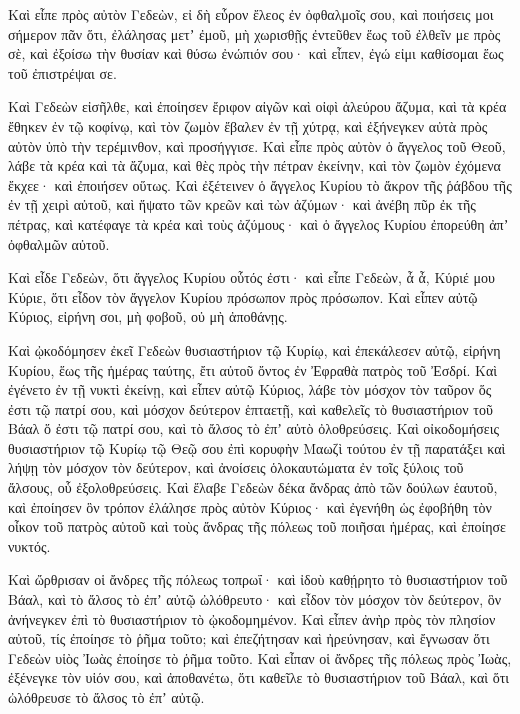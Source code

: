 {Καὶ εἶπε πρὸς αὐτὸν Γεδεὼν, εἰ δὴ εὗρον ἔλεος ἐν ὀφθαλμοῖς σου, καὶ ποιήσεις μοι σήμερον πᾶν ὅτι, ἐλάλησας μετʼ ἐμοῦ,
μὴ χωρισθῇς ἐντεῦθεν ἕως τοῦ ἐλθεῖν με πρὸς σὲ, καὶ ἐξοίσω τὴν θυσίαν καὶ θύσω ἐνώπιόν σου· καὶ εἶπεν, ἐγώ εἰμι καθίσομαι ἕως τοῦ ἐπιστρέψαι σε.
\par }{\PP {}Καὶ Γεδεὼν εἰσῆλθε, καὶ ἐποίησεν ἔριφον αἰγῶν καὶ οἰφὶ ἀλεύρου ἄζυμα, καὶ τὰ κρέα ἔθηκεν ἐν τῷ κοφίνῳ, καὶ τὸν ζωμὸν ἔβαλεν ἐν τῇ χύτρᾳ, καὶ ἐξήνεγκεν αὐτὰ πρὸς αὐτὸν ὑπὸ τὴν τερέμινθον, καὶ προσήγγισε.
Καὶ εἶπε πρὸς αὐτὸν ὁ ἄγγελος τοῦ Θεοῦ, λάβε τὰ κρέα καὶ τὰ ἄζυμα, καὶ θὲς πρὸς τὴν πέτραν ἐκείνην, καὶ τὸν ζωμὸν ἐχόμενα ἔκχεε· καὶ ἐποιήσεν οὕτως.
Καὶ ἐξέτεινεν ὁ ἄγγελος Κυρίου τὸ ἄκρον τῆς ῥάβδου τῆς ἐν τῇ χειρὶ αὐτοῦ, καὶ ἥψατο τῶν κρεῶν καὶ τὼν ἀζύμων· καὶ ἀνέβη πῦρ ἐκ τῆς πέτρας, καὶ κατέφαγε τὰ κρέα καὶ τοὺς ἀζύμους· καὶ ὁ ἄγγελος Κυρίου ἐπορεύθη ἀπʼ ὀφθαλμῶν αὐτοῦ.
\par }{\PP {}Καὶ εἶδε Γεδεὼν, ὅτι ἄγγελος Κυρίου οὗτός ἐστι· καὶ εἶπε Γεδεὼν, ἆ ἆ, Κύριέ μου Κύριε, ὅτι εἶδον τὸν ἄγγελον Κυρίου πρόσωπον πρὸς πρόσωπον.
Καὶ εἶπεν αὐτῷ Κύριος, εἰρήνη σοι, μὴ φοβοῦ, οὐ μὴ ἀποθάνῃς.
\par }{\PP {}Καὶ ᾠκοδόμησεν ἐκεῖ Γεδεὼν θυσιαστήριον τῷ Κυρίῳ, καὶ ἐπεκάλεσεν αὐτῷ, εἰρήνη Κυρίου, ἕως τῆς ἡμέρας ταύτης, ἔτι αὐτοῦ ὄντος ἐν Ἐφραθὰ πατρὸς τοῦ Ἐσδρί.
Καὶ ἐγένετο ἐν τῇ νυκτὶ ἐκείνῃ, καὶ εἶπεν αὐτῷ Κύριος, λάβε τὸν μόσχον τὸν ταῦρον ὅς ἐστι τῷ πατρί σου, καὶ μόσχον δεύτερον ἑπταετῇ, καὶ καθελεῖς τὸ θυσιαστήριον τοῦ Βάαλ ὅ ἐστι τῷ πατρί σου, καὶ τὸ ἄλσος τὸ ἐπʼ αὐτὸ ὀλοθρεύσεις.
Καὶ οἰκοδομήσεις θυσιαστήριον τῷ Κυρίῳ τῷ Θεῷ σου ἐπὶ κορυφὴν Μαωζὶ τούτου ἐν τῇ παρατάξει καὶ λήψῃ τὸν μόσχον τὸν δεύτερον, καὶ ἀνοίσεις ὁλοκαυτώματα ἐν τοῖς ξύλοις τοῦ ἄλσους, οὗ ἐξολοθρεύσεις.
Καὶ ἔλαβε Γεδεὼν δέκα ἄνδρας ἀπὸ τῶν δούλων ἑαυτοῦ, καὶ ἐποίησεν ὃν τρόπον ἐλάλησε πρὸς αὐτὸν Κύριος· καὶ ἐγενήθη ὡς ἐφοβήθη τὸν οἶκον τοῦ πατρὸς αὐτοῦ καὶ τοὺς ἄνδρας τῆς πόλεως τοῦ ποιῆσαι ἡμέρας, καὶ ἐποίησε νυκτός.
\par }{\PP {}Καὶ ὤρθρισαν οἱ ἄνδρες τῆς πόλεως τοπρωΐ· καὶ ἰδοὺ καθῄρητο τὸ θυσιαστήριον τοῦ Βάαλ, καὶ τὸ ἄλσος τὸ ἐπʼ αὐτῷ ὠλόθρευτο· καὶ εἶδον τὸν μόσχον τὸν δεύτερον, ὃν ἀνήνεγκεν ἐπὶ τὸ θυσιαστήριον τὸ ᾠκοδομημένον.
Καὶ εἶπεν ἀνὴρ πρὸς τὸν πλησίον αὐτοῦ, τίς ἐποίησε τὸ ῥῆμα τοῦτο; καὶ ἐπεζήτησαν καὶ ἠρεύνησαν, καὶ ἔγνωσαν ὅτι Γεδεὼν υἱὸς Ἰωὰς ἐποίησε τὸ ῥῆμα τοῦτο.
Καὶ εἶπαν οἱ ἄνδρες τῆς πόλεως πρὸς Ἰωὰς, ἐξένεγκε τὸν υἱόν σου, καὶ ἀποθανέτω, ὅτι καθεῖλε τὸ θυσιαστήριον τοῦ Βάαλ, καὶ ὅτι ὠλόθρευσε τὸ ἄλσος τὸ ἐπʼ αὐτῷ.
}
